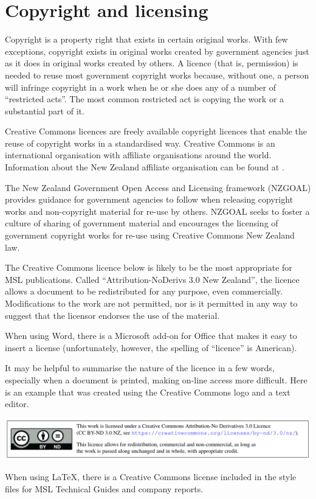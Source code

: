 \section{Copyright and licensing}
 \label{s_copyright}
Copyright is a property right that exists in certain original works. With few exceptions, copyright exists in original works created by government agencies just as it does in original works created by others. A licence (that is, permission) is needed to reuse most government copyright works because, without one, a person will infringe copyright in a work when he or she does any of a number of ``restricted acts''. The most common restricted act is copying the work or a substantial part of it.

Creative Commons licences are freely available copyright licences that enable the reuse of copyright works in a standardised way. Creative Commons is an international organisation with affiliate organisations around the world. Information about the New Zealand affiliate organisation can be found at \cite{CCNZ}. 

The New Zealand Government Open Access and Licensing framework (NZGOAL) \cite{NZGOAL} provides guidance for government agencies to follow when releasing copyright works and non-copyright material for re-use by others. NZGOAL seeks to foster a culture of sharing of government material and encourages the licensing of government copyright works for re-use using Creative Commons New Zealand law.
 
The Creative Commons licence below is likely to be the most appropriate for MSL publications. Called ``Attribution-NoDerivs 3.0 New Zealand'', the licence allows a document to be redistributed for any purpose, even commercially. Modifications to the work are not permitted, nor is it permitted in any way to suggest that the licensor endorses the use of the material. 

When using Word, there is a Microsoft add-on for Office that makes it easy to insert a license (unfortunately, however, the spelling of ``licence'' is American).

It may be helpful to summarise the nature of the licence in a few words, especially when a document is printed, making on-line access more difficult. Here is an example that was created using the Creative Commons logo and a text editor.
\begin{center}
\includegraphics[scale=.41]{pictures/cc_license}
\end{center}

When using LaTeX, there is a Creative Commons license included in the style files for MSL Technical Guides and company reports.